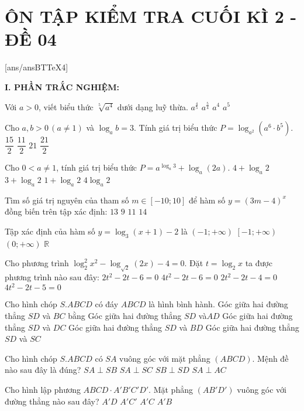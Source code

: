 \section*{ÔN TẬP KIỂM TRA CUỐI KÌ 2 - ĐỀ 04}
\setcounter{ex}{0}\setcounter{bt}{0}
[ans/ansBTTeX4]

\noindent\textbf{I. PHẦN TRẮC NGHIỆM:}
\begin{ex}
Với $a>0$, viết biểu thức $\sqrt[5]{a^4}$ dưới dạng luỹ thừa.
\choice
{${a^{\tfrac{4}{5}}}$}
{${a^{\tfrac{5}{4}}}$}
{$a^4$}
{$a^5$}
\end{ex}
\begin{ex}
Cho $a,b>0\,\left(a\ne 1\right)$ và $\log _ab=3$. Tính giá trị biểu thức $P=\log_{a^2}\left(a^6 \cdot b^5\right)$.
\choice
{$\dfrac{15}{2}$}
{$\dfrac{11}{2}$}
{$21$}
{$\dfrac{21}{2}$}
\end{ex}
\begin{ex}
Cho $0<a\ne 1$, tính giá trị biểu thức $P=a^{\log _a3}+\log _a(2a)$.
\choice
{$4+\log _a2$}
{$3+\log _a2$}
{$1+\log _a2$}
{$4\log _a2$}
\end{ex}
\begin{ex}
Tìm số giá trị nguyên của tham số $m\in [-10;10]$ để hàm số $y=(3m-4)^x$ đồng biến trên tập xác định:
\choice
{$13$}
{$9$}
{$11$}
{$14$}
\end{ex}
\begin{ex}
Tập xác định của hàm số $y=\log _3(x+1)-2$ là
\choice
{$\left(-1;+\infty\right)$}
{$\left[-1;+\infty\right)$}
{$\left(0;+\infty\right)$}
{$\mathbb{R}$}
\end{ex}
\begin{ex}
Cho phương trình $\log _2^2x^2-\log_{\sqrt{2}}(2x)-4=0$. Đặt $t=\log _2x$ ta được phương trình nào sau đây:
\choice
{$2t^2-2t-6=0$}
{$4t^2-2t-6=0$}
{$2t^2-2t-4=0$}
{$4t^2-2t-5=0$}
\end{ex}
\begin{ex}
Cho hình chóp $S.ABCD$ có đáy $ABCD$ là hình bình hành. Góc giữa hai đường thẳng $SD$ và $BC$ bằng
\choice
{Góc giữa hai đường thẳng $SD$ và$AD$}
{Góc giữa hai đường thẳng $SD$ và $DC$}
{Góc giữa hai đường thẳng $SD$ và $BD$}
{Góc giữa hai đường thẳng $SD$ và $SC$}
\end{ex}
\begin{ex}
Cho hình chóp $S.ABCD$ có $SA$ vuông góc với mặt phẳng $(ABCD)$. Mệnh đề nào sau đây là đúng?
\choice
{$SA\perp SB$}
{$SA\perp SC$}
{$SB\perp SD$}
{$SA\perp AC$}
\end{ex}
\begin{ex}
Cho hình lập phương $ABCD \cdot A'B'C'D'$. Mặt phẳng $\left(AB'D'\right)$ vuông góc với đường thẳng nào sau đây?
\choice
{$A'D$}
{$A'C'$}
{$A'C$}
{$A'B$}
\end{ex}
